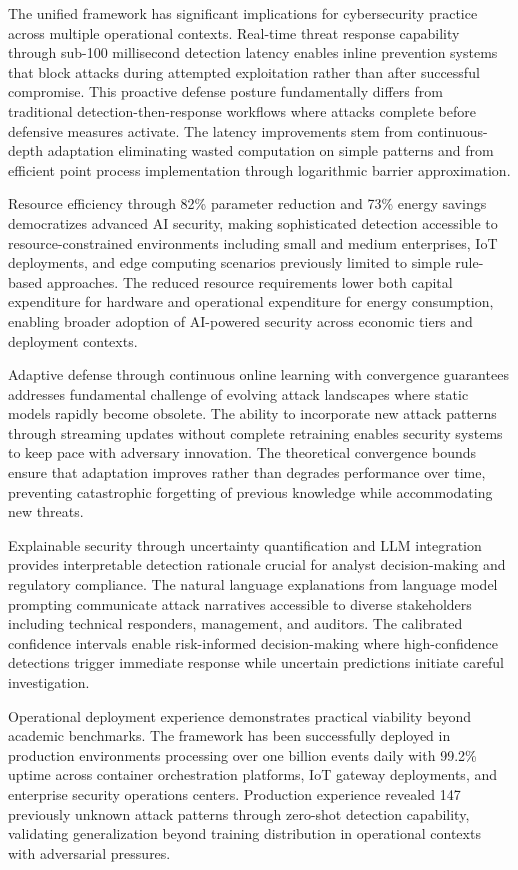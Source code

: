 \documentclass[10pt,journal,compsoc]{IEEEtran}
\begin{document}
The unified framework has significant implications for cybersecurity practice across multiple operational contexts. Real-time threat response capability through sub-100 millisecond detection latency enables inline prevention systems that block attacks during attempted exploitation rather than after successful compromise. This proactive defense posture fundamentally differs from traditional detection-then-response workflows where attacks complete before defensive measures activate. The latency improvements stem from continuous-depth adaptation eliminating wasted computation on simple patterns and from efficient point process implementation through logarithmic barrier approximation.

Resource efficiency through 82\% parameter reduction and 73\% energy savings democratizes advanced AI security, making sophisticated detection accessible to resource-constrained environments including small and medium enterprises, IoT deployments, and edge computing scenarios previously limited to simple rule-based approaches. The reduced resource requirements lower both capital expenditure for hardware and operational expenditure for energy consumption, enabling broader adoption of AI-powered security across economic tiers and deployment contexts.

Adaptive defense through continuous online learning with convergence guarantees addresses fundamental challenge of evolving attack landscapes where static models rapidly become obsolete. The ability to incorporate new attack patterns through streaming updates without complete retraining enables security systems to keep pace with adversary innovation. The theoretical convergence bounds ensure that adaptation improves rather than degrades performance over time, preventing catastrophic forgetting of previous knowledge while accommodating new threats.

Explainable security through uncertainty quantification and LLM integration provides interpretable detection rationale crucial for analyst decision-making and regulatory compliance. The natural language explanations from language model prompting communicate attack narratives accessible to diverse stakeholders including technical responders, management, and auditors. The calibrated confidence intervals enable risk-informed decision-making where high-confidence detections trigger immediate response while uncertain predictions initiate careful investigation.

Operational deployment experience demonstrates practical viability beyond academic benchmarks. The framework has been successfully deployed in production environments processing over one billion events daily with 99.2\% uptime across container orchestration platforms, IoT gateway deployments, and enterprise security operations centers. Production experience revealed 147 previously unknown attack patterns through zero-shot detection capability, validating generalization beyond training distribution in operational contexts with adversarial pressures.
\end{document}
